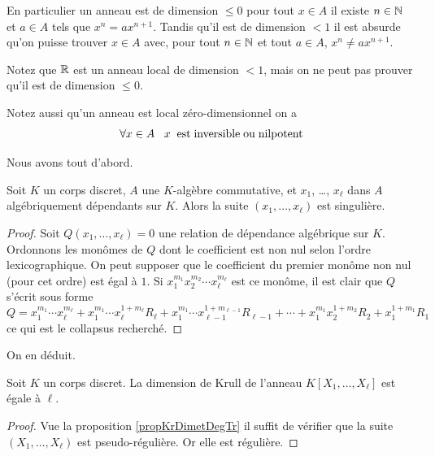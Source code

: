 En particulier un anneau est de dimension $\leq 0$  \ssi pour tout $x\in 
A$ il existe $n\in\mathbb{N}$ et $a\in A$ tels que $x^n=ax^{n+1}$. Tandis qu'il 
est de dimension $<1$ \ssi il est absurde qu'on puisse trouver $x\in A$ 
avec, pour tout  $n\in\mathbb{N}$ et tout $a\in A$, $x^n\neq ax^{n+1}$.

Notez que $\mathbb{R}$ est un anneau local de dimension $<1$, mais on ne
peut pas prouver \cot qu'il est de dimension $\leq 0$.

Notez aussi qu'un anneau est local zéro-dimensionnel \ssi on a
$$\forall x\in A\; \; \; x \; \; {\rm est\; inversible\; ou\;
nilpotent}
$$

Nous avons tout d'abord.
\begin{proposition} 
\label{propKrDimetDegTr} 
Soit $K$ un corps discret, $A$ une $K$-algèbre commutative, et $x_1$, 
\ldots, $x_\ell$ dans $A$  algébriquement dépendants sur $K$. Alors la 
suite
$(x_1,\ldots,x_\ell)$ est singulière.
\end{proposition}
\begin{proof}
Soit $Q(x_1,\ldots,x_\ell)=0$ une relation de dépendance algébrique
sur $K$. Ordonnons les monômes de $Q$ dont le coefficient est non nul 
selon l'ordre lexicographique. On peut supposer \spdg que le coefficient 
du premier monôme non nul (pour cet ordre) est égal à $1$. Si 
$x_1^{m_1}x_2^{m_2}\cdots x_\ell^{m_\ell}$ est ce monôme, il est clair que 
$Q$ s'écrit sous forme
$$ Q=x_1^{m_1}\cdots x_\ell^{m_\ell}+ 
x_1^{m_1}\cdots x_\ell^{1+m_\ell}R_\ell+
x_1^{m_1}\cdots x_{\ell-1}^{1+m_{\ell-1}}R_{\ell-1}+\cdots+
x_1^{m_1}x_2^{1+m_2}R_2+ x_1^{1+m_1}R_1
$$
ce qui est le collapsus recherché.
\end{proof}

On en déduit.
\begin{theorem} 
\label{thKDP} Soit $K$ un corps discret. La dimension de Krull de l'anneau 
$K[X_1,\ldots,X_\ell]$ est égale à $\ell$.
\end{theorem}
\begin{proof}
Vue la proposition \ref{propKrDimetDegTr} il suffit de vérifier que la 
suite $(X_1,\ldots,X_\ell)$ est pseudo-régulière. Or elle est 
régulière. 
\end{proof}

